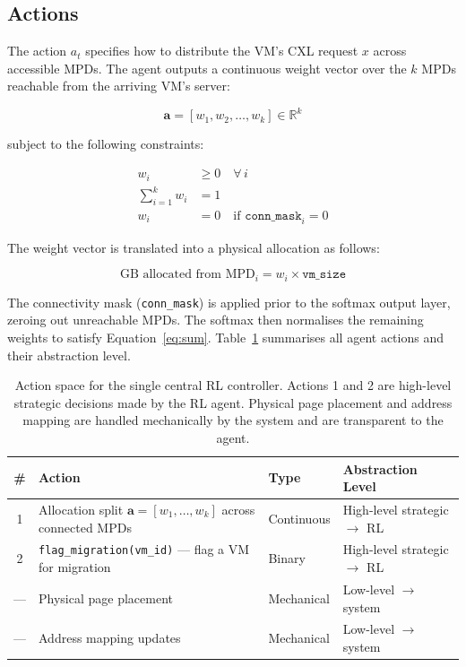 \documentclass[11pt]{article}
\begin{document}
\subsection{Actions}
\label{sec:actions}

The action $a_t$ specifies how to distribute the VM's CXL request $x$ across
accessible MPDs. The agent outputs a continuous weight vector over the $k$
MPDs reachable from the arriving VM's server:

\begin{equation}
    \mathbf{a} = [w_1, w_2, \ldots, w_k] \in \mathbb{R}^k
    \label{eq:action}
\end{equation}

subject to the following constraints:

\begin{align}
    w_i &\geq 0 \quad \forall\, i \label{eq:nonneg} \\
    \sum_{i=1}^{k} w_i &= 1 \label{eq:sum} \\
    w_i &= 0 \quad \text{if } \texttt{conn\_mask}_i = 0 \label{eq:mask}
\end{align}

The weight vector is translated into a physical allocation as follows:

\begin{equation}
    \text{GB allocated from MPD}_i = w_i \times \texttt{vm\_size}
    \label{eq:alloc}
\end{equation}

The connectivity mask (\texttt{conn\_mask}) is applied prior to the softmax
output layer, zeroing out unreachable MPDs. The softmax then normalises the
remaining weights to satisfy Equation~\ref{eq:sum}. Table~\ref{tab:actions}
summarises all agent actions and their abstraction level.

\begin{table}[H]
\centering
\renewcommand{\arraystretch}{1.6}
\setlength{\tabcolsep}{8pt}
\begin{tabularx}{\linewidth}{|c|X|l|X|}
\hline
\textbf{\#} & \textbf{Action} & \textbf{Type} & \textbf{Abstraction Level} \\
\hline
1 & Allocation split $\mathbf{a} = [w_1, \ldots, w_k]$ across connected MPDs
  & Continuous & High-level strategic $\rightarrow$ RL \\
\hline
2 & \texttt{flag\_migration(vm\_id)} --- flag a VM for migration
  & Binary & High-level strategic $\rightarrow$ RL \\
\hline
--- & Physical page placement & Mechanical & Low-level $\rightarrow$ system \\
\hline
--- & Address mapping updates & Mechanical & Low-level $\rightarrow$ system \\
\hline
\end{tabularx}
\caption{Action space for the single central RL controller. Actions 1 and 2
are high-level strategic decisions made by the RL agent. Physical page
placement and address mapping are handled mechanically by the system and are
transparent to the agent.}
\label{tab:actions}
\end{table}
\end{document}
